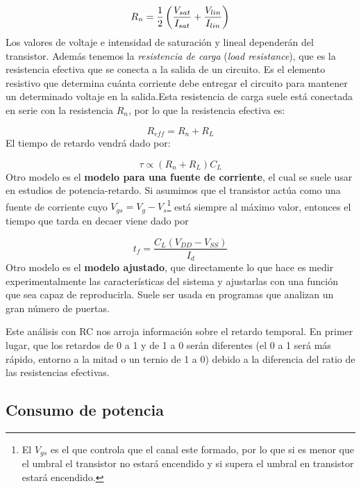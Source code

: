 \begin{equation}
    R_n = \frac{1}{2} \left( \frac{V_{sat}}{I_{sat}}+\frac{V_{lin}}{I_{lin}} \right)
\end{equation}
Los valores de voltaje e intensidad de saturación y lineal dependerán del transistor. Además tenemos la \textit{resistencia de carga} (\textit{load resistance}), que es la resistencia efectiva que se conecta a la salida de un circuito. Es el elemento resistivo que determina cuánta corriente debe entregar el circuito para mantener un determinado voltaje en la salida.Esta resistencia de carga suele está conectada en serie con la resistencia $R_n$, por lo que la resistencia efectiva es: 

\begin{equation}
    R_{eff} = R_n + R_L
\end{equation} 
El tiempo de retardo vendrá dado por: 

\begin{equation}
    \tau \propto (R_n + R_L) C_L
\end{equation}
Otro modelo es el \textbf{modelo para una fuente de corriente}, el cual se suele usar en estudios de potencia-retardo. Si asumimos que el transistor actúa como una fuente de corriente cuyo $V_{gs}=V_g-V_s$\footnote{El $V_{gs}$ es el que controla que el canal este formado, por lo que si es menor que el umbral el transistor no estará encendido y si supera el umbral en transistor estará encendido.} está siempre al máximo valor, entonces el tiempo que tarda en decaer viene dado por 

\begin{equation}
    t_f = \frac{C_L (V_{DD}-V_{SS})}{I_d}
\end{equation}
Otro modelo es el \textbf{modelo ajustado}, que directamente lo que hace es medir experimentalmente las características del sistema y ajustarlas con una función que sea capaz de reproducirla. Suele ser usada en programas que analizan un gran número de puertas. 

Este análisis con RC nos arroja información sobre el retardo temporal. En primer lugar, que los retardos de 0 a 1 y de 1 a 0 serán diferentes (el 0 a 1 será más rápido, entorno a la mitad o un ternio de 1 a 0) debido a la diferencia del ratio de las resistencias efectivas. 

\subsection{Consumo de potencia}

